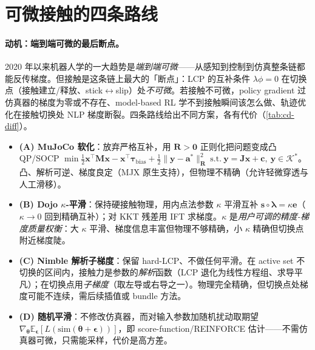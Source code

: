 \section{可微接触的四条路线}
\label{sec:cd-diffcontact}

\paragraph{动机：端到端可微的最后断点。}
2020 年以来机器人学的一大趋势是\emph{端到端可微}——从感知到控制到仿真整条链都能反传梯度。但接触是这条链上最大的「断点」：LCP 的互补条件 $\lambda\phi=0$ 在切换点（接触建立/释放、stick$\leftrightarrow$slip）处\emph{不可微}。若接触不可微，policy gradient 过仿真器的梯度为零或不存在、model-based RL 学不到接触瞬间该怎么做、轨迹优化在接触切换处 NLP 梯度断裂。四条路线给出不同方案，各有代价（\cref{tab:cd-diff}）。

\begin{itemize}
  \item \textbf{(A) MuJoCo 软化}\cite{todorov2014convex}：放弃严格互补，用 $\mathbf R>\mathbf 0$ 正则化把问题变成凸 QP/SOCP $\min\tfrac12\mathbf x^\top\mathbf M\mathbf x-\mathbf x^\top\boldsymbol\tau_{\text{bias}}+\tfrac12\|\mathbf y-\mathbf a^*\|_{\mathbf R}^2\ \text{s.t.}\ \mathbf y=\mathbf J\mathbf x+\mathbf c,\ \mathbf y\in\mathcal K^*$。凸、解析可逆、梯度良定（MJX 原生支持），但物理不精确（允许轻微穿透与人工滑移）。
  \item \textbf{(B) Dojo $\kappa$-平滑}\cite{howell2022dojo}：保持硬接触物理，用内点法参数 $\kappa$ 平滑互补 $\mathbf s\circ\boldsymbol\lambda=\kappa\mathbf e$（$\kappa\to0$ 回到精确互补）；对 KKT 残差用 IFT 求梯度。$\kappa$ 是\emph{用户可调的精度-梯度质量权衡}：大 $\kappa$ 平滑、梯度信息丰富但物理不够精确，小 $\kappa$ 精确但切换点附近梯度陡。
  \item \textbf{(C) Nimble 解析子梯度}\cite{werling2021fast}：保留 hard-LCP、不做任何平滑。在 active set 不切换的区间内，接触力是参数的\emph{解析}函数（LCP 退化为线性方程组、求导平凡）；在切换点用\emph{子梯度}（取左导或右导之一）。物理完全精确，但切换点处梯度可能不连续，需后续插值或 bundle 方法。
  \item \textbf{(D) 随机平滑}\cite{suh2022differentiable}：不修改仿真器，而对输入参数加随机扰动取期望 $\nabla_{\boldsymbol\theta}\mathbb E_{\boldsymbol\epsilon}[L(\text{sim}(\boldsymbol\theta+\boldsymbol\epsilon))]$，即 score-function/REINFORCE 估计——不需仿真器可微，只需能采样，代价是高方差。
\end{itemize}

